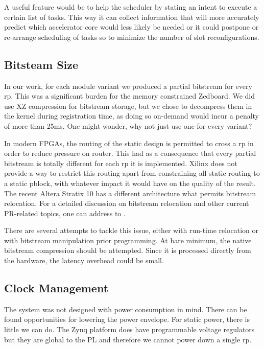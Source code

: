 A useful feature would be to help the scheduler by stating an intent to execute a certain list of tasks.
This way it can collect information that will more accurately predict which accelerator core would less likely be needed
or it could postpone or re-arrange scheduling of tasks so to minimize the number of slot reconfigurations.

\subsection{Bitsteam Size}

In our work, for each module variant we produced a partial bitstream for every \gls{rp}.
This was a significant burden for the memory constrained Zedboard. We did use XZ compression for bitstream storage,
but we chose to decompress them in the kernel during registration time, as doing so on-demand would incur a penalty of
more than 25ms. One might wonder, why not just use one for every variant?

In modern FPGAs, the routing of the static design is permitted to cross a \gls{rp} in order to reduce pressure on router.
This had as a consequence that every partial bitstream is totally different for each \gls{rp} it is implemented.
Xilinx does not provide a way to restrict this routing apart from constraining all static routing to a static pblock,
with whatever impact it would have on the quality of the result. The recent Altera Stratix 10 has a different architecture
what permits bitstream relocation. For a detailed discussion on bitstream relocation and other current PR-related topics,
one can address to \cite{survey}.

There are several attempts to tackle this issue, either with run-time relocation or with bitstream manipulation prior programming.
At bare minimum, the native bitstream compression should be attempted. Since it is processed directly from the hardware,
the latency overhead could be small.

\subsection{Clock Management}

The system was not designed with power consumption in mind. There can be found opportunities for lowering the power envelope.
For static power, there is little we can do. The Zynq platform does have programmable voltage regulators but they are global to the PL
and therefore we cannot power down a single \gls{rp}.

